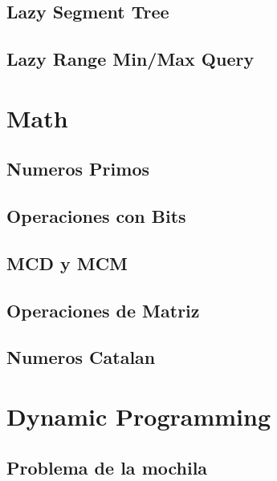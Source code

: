 \subsection{Lazy Segment Tree}
\raggedbottom
\hrulefill
\subsection{Lazy Range Min/Max Query}
\raggedbottom
\hrulefill

\section{Math}
\subsection{Numeros Primos}
\raggedbottom
\hrulefill
\subsection{Operaciones con Bits}
\raggedbottom
\hrulefill
\subsection{MCD y MCM}
\raggedbottom
\hrulefill
\subsection{Operaciones de Matriz}
\raggedbottom
\hrulefill
\subsection{Numeros Catalan}
\raggedbottom
\hrulefill

\section{Dynamic Programming}
\subsection{Problema de la mochila}
\raggedbottom
\hrulefill

